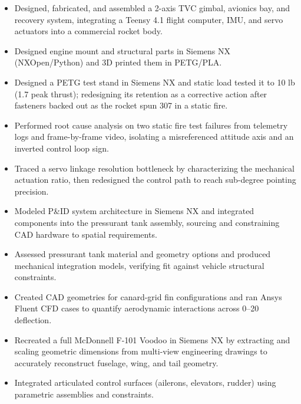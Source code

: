 \begin{itemize}
  \item Designed, fabricated, and assembled a 2-axis TVC gimbal, avionics bay, and recovery system, integrating a Teensy 4.1 flight computer, IMU, and servo actuators into a commercial rocket body.
  \item Designed engine mount and structural parts in Siemens NX (NXOpen/Python) and 3D printed them in PETG/PLA.
  \item Designed a PETG test stand in Siemens NX and static load tested it to 10 lb (1.7\texttimes{} peak thrust); redesigning its retention as a corrective action after fasteners backed out as the rocket spun 307\textdegree{} in a static fire.
  \item Performed root cause analysis on two static fire test failures from telemetry logs and frame-by-frame video, isolating a misreferenced attitude axis and an inverted control loop sign.
  \item Traced a servo linkage resolution bottleneck by characterizing the mechanical actuation ratio, then redesigned the control path to reach sub-degree pointing precision.
\end{itemize}
\entrygap

\begin{itemize}
  \item Modeled P\&ID system architecture in Siemens NX and integrated components into the pressurant tank assembly, sourcing and constraining CAD hardware to spatial requirements.
  \item Assessed pressurant tank material and geometry options and produced mechanical integration models, verifying fit against vehicle structural constraints.
  \item Created CAD geometries for canard-grid fin configurations and ran Ansys Fluent CFD cases to quantify aerodynamic interactions across 0--20\textdegree{} deflection.
\end{itemize}
\entrygap

\begin{itemize}
  \item Recreated a full McDonnell F-101 Voodoo in Siemens NX by extracting and scaling geometric dimensions from multi-view engineering drawings to accurately reconstruct fuselage, wing, and tail geometry.
  \item Integrated articulated control surfaces (ailerons, elevators, rudder) using parametric assemblies and constraints.
\end{itemize}
\entrygap

